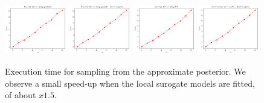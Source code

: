 \begin{figure}[h]
    \begin{center}
      \includegraphics[width=0.24\textwidth]{./Thesis/images/chapter4/exec_sample_grad.png}
      \includegraphics[width=0.24\textwidth]{./Thesis/images/chapter4/exec_sample_grad_fit.png}
      \includegraphics[width=0.24\textwidth]{./Thesis/images/chapter4/exec_sample_bo.png}
      \includegraphics[width=0.24\textwidth]{./Thesis/images/chapter4/exec_sample_bo_fit.png}
    \end{center}
    \caption{Execution time for sampling from the approximate
      posterior. We observe a small speed-up when the local surogate
      models are fitted, of about $x1.5$.}
  \label{fig:exec_sample}
\end{figure}
